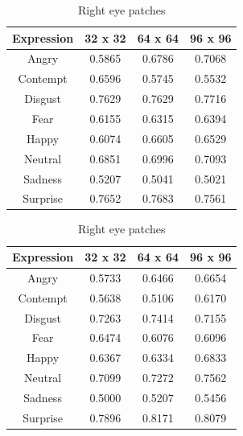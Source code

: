 \begin{table}

    \begin{subtable}[b]{3in}
    \centering
    \begin{tabular}{| c | c | c | c |}
    \hline
    Expression & 32 x 32 &  64 x 64  & 96 x 96  \\
    \hline
    Angry & 0.5865 & 0.6786 & 0.7068 \\
    Contempt & 0.6596 &	0.5745 & 0.5532 \\
    Disgust	& 0.7629 &	0.7629 &	0.7716 \\
    Fear &	0.6155 & 0.6315 & 0.6394 \\
    Happy &	0.6074 & 0.6605 & 0.6529 \\
    Neutral & 0.6851 &	0.6996 & 0.7093 \\
    Sadness & 0.5207 & 0.5041 &	0.5021 \\
    Surprise & 0.7652 &	0.7683 & 0.7561 \\
    \hline
    \end{tabular}
    \caption{Left eye patches}
    \label{table:left_eye}
    \end{subtable}
\quad


    \begin{subtable}[b]{3in}
    \centering
    \begin{tabular}{| c | c | c | c |}
    \hline
    Expression & 32 x 32 &  64 x 64  & 96 x 96  \\
    \hline
    Angry    & 0.5733 & 0.6466 & 0.6654 \\
    Contempt & 0.5638 & 0.5106 & 0.6170 \\
    Disgust	 & 0.7263 & 0.7414 & 0.7155 \\
    Fear	 & 0.6474 & 0.6076 & 0.6096 \\
    Happy	 & 0.6367 & 0.6334 & 0.6833 \\
    Neutral  & 0.7099 & 0.7272 & 0.7562 \\
    Sadness  & 0.5000 & 0.5207 & 0.5456 \\
    Surprise & 0.7896 & 0.8171 & 0.8079 \\
    \hline
    \end{tabular}
    \caption{Right eye patches}
    \label{table:right_eye}
    \end{subtable}
\quad



\end{table}

